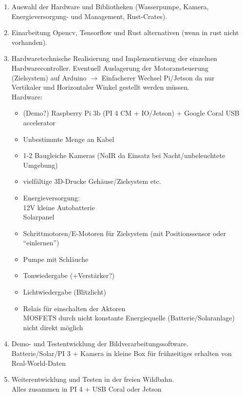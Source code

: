 

\begin{enumerate}
    \item Auswahl der Hardware und Bibliotheken (Wasserpumpe, Kamera, Energieversorgung- und Management, Rust-Crates).
    \item Einarbeitung Opencv, Tensorflow und Rust alternativen (wenn in rust nicht vorhanden).
    \item Hardwaretechnische Realisierung und Implementierung der einzelnen Hardwarecontroller.
            Eventuell Auslagerung der Motoransteuerung (Zielsystem) auf Arduino $\rightarrow$
            Einfacherer Wechsel Pi/Jetson da nur Vertikaler und Horizontaler Winkel
            gestellt werden müssen.\\
            Hardware:
            \begin{itemize}
                \item (Demo?) Raspberry Pi 3b (PI 4 CM + IO/Jetson) + Google Coral USB accelerator
                \item Unbestimmte Menge an Kabel
                \item 1-2 Baugleiche Kameras (NoIR da Einsatz bei Nacht/unbeleuchtete Umgebung)
                \item vielfältige 3D-Drucke Gehäuse/Zielsystem etc.
                \item Energieversorgung:\\
                    12V kleine Autobatterie\\
                    Solarpanel
                \item Schrittmotoren/E-Motoren für Zielsystem (mit Positionssensor oder "`einlernen"')
                \item Pumpe mit Schläuche
                \item Tonwiedergabe (+Verstärker?)
                \item Lichtwiedergabe (Blitzlicht)
                \item Relais für einschalten der Aktoren
                \\ MOSFETS durch nicht konstante Energiequelle (Batterie/Solaranlage) nicht direkt möglich
            \end{itemize}
    \item Demo- und Testentwicklung der Bildverarbeitungssoftware.
    \\ Batterie/Solar/PI 3 + Kamera in kleine Box für frühzeitiges erhalten von Real-World-Daten
    \item Weiterentwicklung und Testen in der freien Wildbahn.
    \\ Alles zusammen in PI 4 + USB Coral oder Jetson
\end{enumerate}

